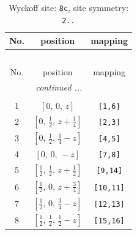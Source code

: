 \documentclass[fleqn,8pt]{jsarticle}
\begin{document}
\renewcommand{\arraystretch}{1.2}
\begin{longtable}{ccc}
\caption{Wyckoff site: {\tt 8c}, site symmetry: {\tt 2..}}
 \\
 \hline \hline
No. & position & mapping \\ \hline \endfirsthead

\multicolumn{2}{l}{\tablename\ \thetable{}} \\
 \hline \hline
No. & position & mapping \\ \hline \endhead

 \hline \hline
\multicolumn{2}{r}{\footnotesize\it continued ...} \\ \endfoot

 \hline \hline
\multicolumn{2}{r}{} \\ \endlastfoot

1 & $\left[ 0,\, 0,\, z \right]$ & {\tt [1,6]} \\ \hline
2 & $\left[ 0,\, \frac{1}{2},\, z + \frac{1}{4} \right]$ & {\tt [2,3]} \\ \hline
3 & $\left[ 0,\, \frac{1}{2},\, \frac{1}{4} - z \right]$ & {\tt [4,5]} \\ \hline
4 & $\left[ 0,\, 0,\, - z \right]$ & {\tt [7,8]} \\ \hline
5 & $\left[ \frac{1}{2},\, \frac{1}{2},\, z + \frac{1}{2} \right]$ & {\tt [9,14]} \\ \hline
6 & $\left[ \frac{1}{2},\, 0,\, z + \frac{3}{4} \right]$ & {\tt [10,11]} \\ \hline
7 & $\left[ \frac{1}{2},\, 0,\, \frac{3}{4} - z \right]$ & {\tt [12,13]} \\ \hline
8 & $\left[ \frac{1}{2},\, \frac{1}{2},\, \frac{1}{2} - z \right]$ & {\tt [15,16]} \\
\end{longtable}
\renewcommand{\arraystretch}{1.2}
\end{document}

